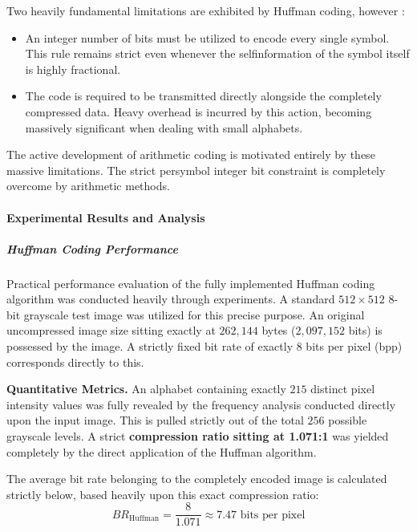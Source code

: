 Two heavily fundamental limitations are exhibited by Huffman coding, however \cite{Huffman1952}:
\begin{itemize}
    \item An integer number of bits must be utilized to encode every single symbol. This rule remains strict even whenever the selfinformation of the symbol itself is highly fractional.
    \item The code is required to be transmitted directly alongside the completely compressed data. Heavy overhead is incurred by this action, becoming massively significant when dealing with small alphabets.
\end{itemize}

The active development of arithmetic coding is motivated entirely by these massive limitations. The strict persymbol integer bit constraint is completely overcome by arithmetic methods.



\paragraph{Experimental Results and Analysis}

\subparagraph{Huffman Coding Performance}

Practical performance evaluation of the fully implemented Huffman coding algorithm was conducted heavily through experiments. A standard $512 \times 512$ 8-bit grayscale test image was utilized for this precise purpose. An original uncompressed image size sitting exactly at $262,144$ bytes ($2,097,152$ bits) is possessed by the image. A strictly fixed bit rate of exactly $8$ bits per pixel (bpp) corresponds directly to this.

\vspace{1em}
\noindent\textbf{Quantitative Metrics.} An alphabet containing exactly $215$ distinct pixel intensity values was fully revealed by the frequency analysis conducted directly upon the input image. This is pulled strictly out of the total $256$ possible grayscale levels. A strict \textbf{compression ratio sitting at 1.071:1} was yielded completely by the direct application of the Huffman algorithm.

The average bit rate belonging to the completely encoded image is calculated strictly below, based heavily upon this exact compression ratio:
\begin{equation}
    BR_{\text{Huffman}} = \frac{8}{1.071} \approx 7.47 \text{ bits per pixel}
\end{equation}

